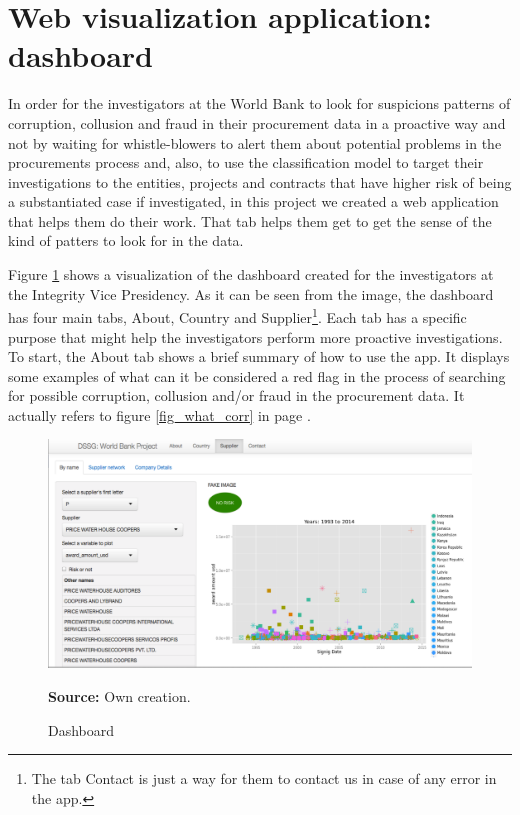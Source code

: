 \section{Web visualization application: dashboard} \label{sec_visual}

In order for the investigators at the World Bank to look for suspicions patterns of corruption, collusion and fraud in their procurement data in a proactive way and not by waiting for whistle-blowers to alert them about potential  problems in the procurements process and, also, to use the classification model to target their investigations to the entities, projects and contracts that have higher risk of being a substantiated case if investigated, in this project we created a web application that helps them do their work. That tab helps them get to get the sense of the kind of patters to look for in the data.


Figure \ref{fig_dashboard} shows a visualization of the dashboard created for the investigators at the Integrity Vice Presidency. As it can be seen from the image, the dashboard has four main tabs, About, Country and Supplier\footnote{The tab Contact is just a way for them to contact us in case of any error in the app.}. Each tab has a specific purpose that might help the investigators perform more proactive investigations. To start, the About tab shows a brief summary of how to use the app. It displays some examples of what can it be considered a red flag in the process of searching for possible corruption, collusion and/or fraud in the procurement data. It actually refers to figure \ref{fig_what_corr} in page \pageref{fig_what_corr}.

\begin{figure}[H]
\begin{center}
\caption{Dashboard}
\label{fig_dashboard}
\includegraphics[width=1.05\textwidth,keepaspectratio]{../img/dashboard.pdf}
\end{center}
\noindent \footnotesize{\textbf{Source:} Own creation.}
\end{figure}


